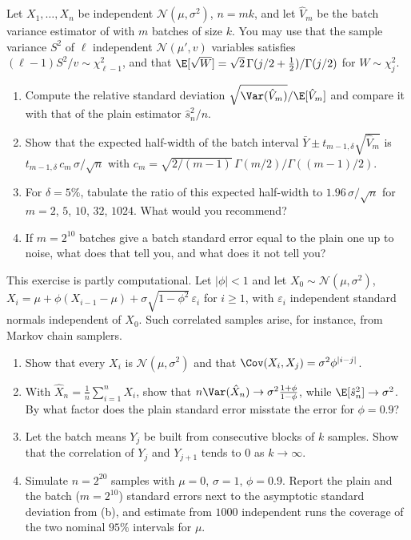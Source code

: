 \begin{exercise}\label{ex:mc-batch-noise}
\medium Let $X_1,\dots,X_n$ be independent $\mathcal N(\mu,\sigma^2)$, $n=mk$, and let
$\hat V_m$ be the batch variance estimator of  with $m$ batches of
size $k$. You may use that the sample variance $S^2$ of $\ell$ independent
$\mathcal N(\mu',v)$ variables satisfies $(\ell-1)S^2/v\sim\chi^2_{\ell-1}$, and that
$\E[\sqrt W]=\sqrt2\,\Gamma(j/2+\frac12)/\Gamma(j/2)$ for $W\sim\chi^2_j$.
\begin{enumerate}[label=(\alph*)]
  \item Compute the relative standard deviation $\sqrt{\Var(\hat V_m)}/\E[\hat V_m]$ and
    compare it with that of the plain estimator $\hat s_n^2/n$.
  \item Show that the expected half-width of the batch interval
    $\bar Y\pm t_{m-1,\delta}\sqrt{\hat V_m}$ is $t_{m-1,\delta}\,c_m\,\sigma/\sqrt n$ with
    $c_m=\sqrt{2/(m-1)}\,\Gamma(m/2)/\Gamma((m-1)/2)$.
  \item For $\delta=5\%$, tabulate the ratio of this expected half-width to $1.96\,\sigma/\sqrt n$
    for $m=2$, $5$, $10$, $32$, $1024$. What would you recommend?
  \item If $m=2^{10}$ batches give a batch standard error equal to the plain one up to noise,
    what does that tell you, and what does it not tell you?
\end{enumerate}
\end{exercise}

\begin{exercise}\label{ex:mc-dependent}
\medium This exercise is partly computational. Let $|\phi|<1$ and let
$X_0\sim\mathcal N(\mu,\sigma^2)$, $X_i=\mu+\phi(X_{i-1}-\mu)+\sigma\sqrt{1-\phi^2}\,\varepsilon_i$ for
$i\ge1$, with $\varepsilon_i$ independent standard normals independent of $X_0$. Such
correlated samples arise, for instance, from Markov chain samplers.
\begin{enumerate}[label=(\alph*)]
  \item Show that every $X_i$ is $\mathcal N(\mu,\sigma^2)$ and that
    $\Cov(X_i,X_j)=\sigma^2\phi^{|i-j|}$.
  \item With $\hat X_n=\frac1n\sum_{i=1}^nX_i$, show that
    $n\Var(\hat X_n)\to\sigma^2\frac{1+\phi}{1-\phi}$, while $\E[\hat s_n^2]\to\sigma^2$. By what
    factor does the plain standard error misstate the error for $\phi=0.9$?
  \item Let the batch means $Y_j$ be built from consecutive blocks of $k$ samples. Show that
    the correlation of $Y_j$ and $Y_{j+1}$ tends to $0$ as $k\to\infty$.
  \item Simulate $n=2^{20}$ samples with $\mu=0$, $\sigma=1$, $\phi=0.9$. Report the plain
    and the batch ($m=2^{10}$) standard errors next to the asymptotic standard deviation
    from (b), and estimate from $1000$ independent runs the coverage of the two nominal
    $95\%$ intervals for $\mu$.
\end{enumerate}
\end{exercise}

